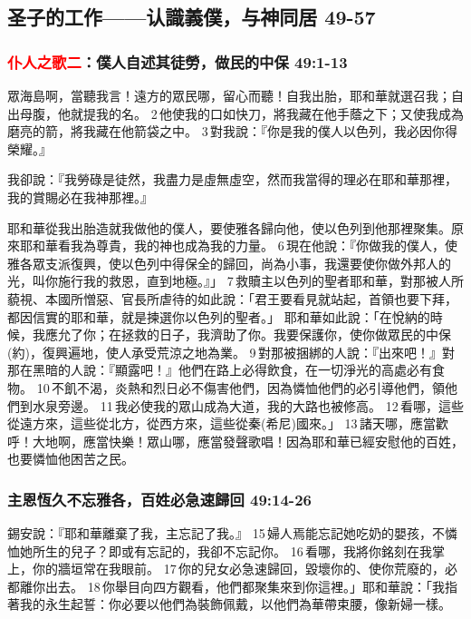 \subsection{圣子的工作——认識義僕，与神同居 49-57}
\subsubsection{\textcolor{red}{仆人之歌二}：僕人自述其徒勞，做民的中保 49:1-13}
眾海島啊，當聽我言！遠方的眾民哪，留心而聽！自我出胎，耶和華就選召我；自出母腹，他就提我的名。 2 他使我的口如快刀，將我藏在他手蔭之下；又使我成為磨亮的箭，將我藏在他箭袋之中。 3 對我說：『你是我的僕人以色列，我必因你得榮耀。』

我卻說：『我勞碌是徒然，我盡力是虛無虛空，然而我當得的理必在耶和華那裡，我的賞賜必在我神那裡。』

耶和華從我出胎造就我做他的僕人，要使雅各歸向他，使以色列到他那裡聚集。原來耶和華看我為尊貴，我的神也成為我的力量。 6 現在他說：『你做我的僕人，使雅各眾支派復興，使以色列中得保全的歸回，尚為小事，我還要使你做外邦人的光，叫你施行我的救恩，直到地極。』」
7 救贖主以色列的聖者耶和華，對那被人所藐視、本國所憎惡、官長所虐待的如此說：「君王要看見就站起，首領也要下拜，都因信實的耶和華，就是揀選你以色列的聖者。」
耶和華如此說：「在悅納的時候，我應允了你；在拯救的日子，我濟助了你。我要保護你，使你做眾民的中保(約)，復興遍地，使人承受荒涼之地為業。 9 對那被捆綁的人說：『出來吧！』對那在黑暗的人說：『顯露吧！』他們在路上必得飲食，在一切淨光的高處必有食物。 10 不飢不渴，炎熱和烈日必不傷害他們，因為憐恤他們的必引導他們，領他們到水泉旁邊。 11 我必使我的眾山成為大道，我的大路也被修高。 12 看哪，這些從遠方來，這些從北方，從西方來，這些從秦(希尼)國來。」 13 諸天哪，應當歡呼！大地啊，應當快樂！眾山哪，應當發聲歌唱！因為耶和華已經安慰他的百姓，也要憐恤他困苦之民。

\subsubsection{主恩恆久不忘雅各，百姓必急速歸回 49:14-26}
錫安說：『耶和華離棄了我，主忘記了我。』 15 婦人焉能忘記她吃奶的嬰孩，不憐恤她所生的兒子？即或有忘記的，我卻不忘記你。 16 看哪，我將你銘刻在我掌上，你的牆垣常在我眼前。 17 你的兒女必急速歸回，毀壞你的、使你荒廢的，必都離你出去。 18 你舉目向四方觀看，他們都聚集來到你這裡。」耶和華說：「我指著我的永生起誓：你必要以他們為裝飾佩戴，以他們為華帶束腰，像新婦一樣。 

